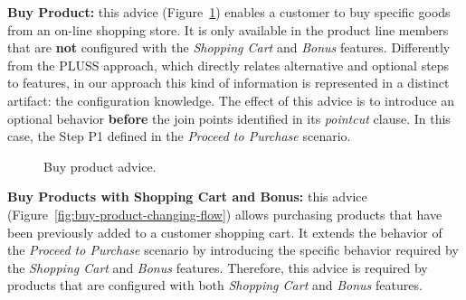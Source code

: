 {\bf Buy Product:} this advice (Figure~\ref{fig:buy-product-scenario}) enables a
customer to buy specific goods from an on-line shopping store. It is only
available in the product line members that are {\bf not} configured with the
\emph{Shopping Cart} and \emph{Bonus} features. Differently from the PLUSS
approach, which directly relates alternative and optional steps to features, in
our approach this kind of information is represented in a distinct artifact: the
configuration knowledge. The effect of this advice is to introduce an optional behavior {\bf
before} the join points identified in its \emph{pointcut} clause. In this case,
the Step P1 defined in the \emph{Proceed to Purchase} scenario.

\begin{figure}[h]
\caption{Buy product advice.}
\label{fig:buy-product-scenario}
\end{figure}

{\bf Buy Products with Shopping Cart and Bonus:} this advice
(Figure~\ref{fig:buy-product-changing-flow}) allows purchasing products
that have been previously added to a customer shopping cart. It extends the
behavior of the \emph{Proceed to Purchase} scenario by introducing the specific
behavior required by the \emph{Shopping Cart} and
\emph{Bonus} features. Therefore, this advice is required by products that
are configured with both \emph{Shopping Cart} and \emph{Bonus} features.

